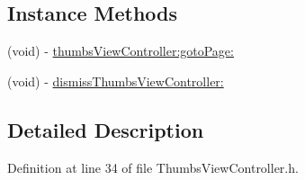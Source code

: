 \subsection*{Instance Methods}
\begin{DoxyCompactItemize}
\item 
(void) -\/ \hyperlink{protocol_thumbs_view_controller_delegate-p_a54bb19fb8038c4598e3a5a05dd9710a7}{thumbs\-View\-Controller\-:goto\-Page\-:}
\item 
(void) -\/ \hyperlink{protocol_thumbs_view_controller_delegate-p_a8520af536c2045525c5ce832d19d72dd}{dismiss\-Thumbs\-View\-Controller\-:}
\end{DoxyCompactItemize}


\subsection{Detailed Description}


Definition at line 34 of file Thumbs\-View\-Controller.\-h.



